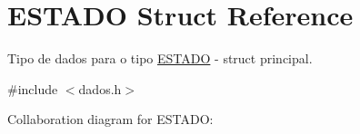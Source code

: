 \hypertarget{structESTADO}{}\section{E\+S\+T\+A\+DO Struct Reference}
\label{structESTADO}


Tipo de dados para o tipo \hyperlink{structESTADO}{E\+S\+T\+A\+DO} -\/ struct principal.  




{\ttfamily \#include $<$dados.\+h$>$}



Collaboration diagram for E\+S\+T\+A\+DO\+:
